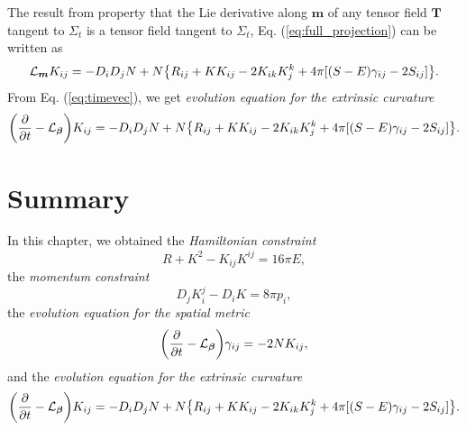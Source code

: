 The result from property that the Lie derivative along $\bm{m}$ of any tensor field $\bm{T}$ tangent to $\Sigma_t$ is a tensor field tangent to $\Sigma_t$, Eq. (\ref{eq:full_projection}) can be written as
\begin{equation}
	\mathcal{L}_{\bm{m}}K_{ij} =  -D_i D_j N + N\qty{ R_{ij} + KK_{ij} - 2K_{ik}K^k_j +4\pi \qty[(S-E)\gamma_{ij}-2S_{ij}]}.
\end{equation}
From Eq. (\ref{eq:timevec}), we get \emph{evolution equation for the extrinsic curvature}
\begin{equation}
	\qty(\pdv{t} - \mathcal{L}_{\bm{\beta}})K_{ij} = -D_i D_j N + N\qty{ R_{ij} + KK_{ij} - 2K_{ik}K^k_j +4\pi \qty[(S-E)\gamma_{ij}-2S_{ij}]}.
\end{equation}

\section{Summary}
In this chapter, we obtained
the \emph{Hamiltonian constraint}
\begin{equation}
	\label{eq:hamiltonian_constraint}
	R+K^2-K_{ij}K^{ij} = 16\pi E,
\end{equation}
the \emph{momentum constraint}
\begin{equation}
	\label{eq:momentum_constraint}
	D_j K^j_i - D_i K = 8 \pi p_i,
\end{equation}
the \emph{evolution equation for the spatial metric}
\begin{equation}
	\label{eq:evolution_spatial}
\qty(\pdv{t} - \mathcal{L}_{\bm{\beta}})\gamma_{ij} = -2NK_{ij},
\end{equation}
and the \emph{evolution equation for the extrinsic curvature}
\begin{equation}
	\label{eq:evoultion_extrinsic}
	\qty(\pdv{t} - \mathcal{L}_{\bm{\beta}})K_{ij} = -D_i D_j N + N\qty{ R_{ij} + KK_{ij} - 2K_{ik}K^k_j +4\pi \qty[(S-E)\gamma_{ij}-2S_{ij}]}.
\end{equation}



